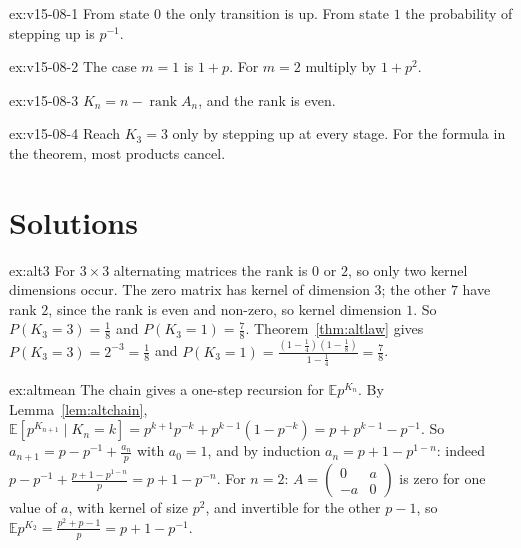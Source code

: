 \begin{hint}{ex:v15-08-1}
From state \(0\) the only transition is up. From state \(1\) the probability of stepping up is \(p^{-1}\).
\end{hint}

\begin{hint}{ex:v15-08-2}
The case \(m=1\) is \(1+p\). For \(m=2\) multiply by \(1+p^2\).
\end{hint}

\begin{hint}{ex:v15-08-3}
\(K_n=n-\operatorname{rank}A_n\), and the rank is even.
\end{hint}

\begin{hint}{ex:v15-08-4}
Reach \(K_3=3\) only by stepping up at every stage. For the formula in the theorem, most products cancel.
\end{hint}

\section{Solutions}

\begin{solution}{ex:alt3}
\idea For $3\times3$ alternating matrices the rank is $0$ or $2$, so only two kernel dimensions occur.
\writeup The zero matrix has kernel of dimension $3$; the other $7$ have rank $2$, since the rank is even and non-zero, so kernel dimension $1$. So $P(K_3=3)=\frac18$ and $P(K_3=1)=\frac78$. Theorem~\ref{thm:altlaw} gives $P(K_3=3)=2^{-3}=\frac18$ and $P(K_3=1)=\frac{(1-\frac14)(1-\frac18)}{1-\frac14}=\frac78$.
\end{solution}

\begin{solution}{ex:altmean}
\idea The chain gives a one-step recursion for $\mathbb Ep^{K_n}$.
\writeup By Lemma~\ref{lem:altchain}, $\mathbb E[p^{K_{n+1}}\mid K_n=k]=p^{k+1}p^{-k}+p^{k-1}(1-p^{-k})=p+p^{k-1}-p^{-1}$. So $a_{n+1}=p-p^{-1}+\frac{a_n}p$ with $a_0=1$, and by induction $a_n=p+1-p^{1-n}$: indeed $p-p^{-1}+\frac{p+1-p^{1-n}}p=p+1-p^{-n}$. For $n=2$: $A=\begin{pmatrix}0&a\\-a&0\end{pmatrix}$ is zero for one value of $a$, with kernel of size $p^2$, and invertible for the other $p-1$, so $\mathbb Ep^{K_2}=\frac{p^2+p-1}p=p+1-p^{-1}$.
\end{solution}

